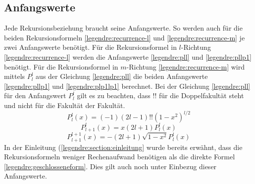 \subsection{Anfangswerte
\label{legendre:subsection:anfangswerte}}
Jede Rekursionsbeziehung braucht seine Anfangswerte.
So werden auch für die beiden Rekursionsformeln \eqref{legendre:recurrence-l} und \eqref{legendre:recurrence-m} je zwei Anfangswerte benötigt.
Für die Rekursionsformel in $l$-Richtung \eqref{legendre:recurrence-l} werden die Anfangswerte \eqref{legendre:pll} und \eqref{legendre:pllp1} benötigt.
Für die Rekursionsformel in $m$-Richtung \eqref{legendre:recurrence-m} wird mittels $P^{l}_{l}$ aus der Gleichung \eqref{legendre:pll} die beiden Anfangswerte \eqref{legendre:pllp1} und \eqref{legendre:plp1lp1} berechnet.
Bei der Gleichung \eqref{legendre:pll} für den Anfangswert $P^{l}_{l}$ gilt es zu beachten, dass $!!$ für die Doppelfakultät steht und nicht für die Fakultät der Fakultät.
\begin{equation}
P^{l}_{l}(x)
=(-1)(2l-1)!!(1-x^2)^{l/2}
\label{legendre:pll}
\end{equation}
\begin{equation}
P^{l}_{l+1}(x)
=x(2l+1)P^{l}_{l}(x)
\label{legendre:pllp1}
\end{equation}
\begin{equation}
P^{l+1}_{l+1}(x)
=-(2l+1)\sqrt{1-x^2}P^{l}_{l}(x)
\label{legendre:plp1lp1}
\end{equation}
In der Einleitung (\ref{legendre:section:einleitung} wurde bereits erwähnt, dass die Rekursionsformeln weniger Rechenaufwand benötigen als die direkte Formel \eqref{legendre:geschlosseneform}.
Dies gilt auch noch unter Einbezug dieser Anfangswerte.

